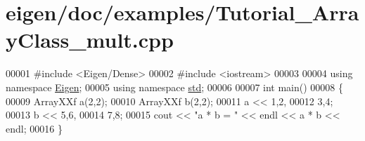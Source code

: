 \hypertarget{eigen_2doc_2examples_2_tutorial___array_class__mult_8cpp_source}{}\section{eigen/doc/examples/\+Tutorial\+\_\+\+Array\+Class\+\_\+mult.cpp}
\label{eigen_2doc_2examples_2_tutorial___array_class__mult_8cpp_source}

\begin{DoxyCode}
00001 \textcolor{preprocessor}{#include <Eigen/Dense>}
00002 \textcolor{preprocessor}{#include <iostream>}
00003 
00004 \textcolor{keyword}{using namespace }\hyperlink{namespace_eigen}{Eigen};
00005 \textcolor{keyword}{using namespace }\hyperlink{namespacestd}{std};
00006 
00007 \textcolor{keywordtype}{int} main()
00008 \{
00009   ArrayXXf a(2,2);
00010   ArrayXXf b(2,2);
00011   a << 1,2,
00012        3,4;
00013   b << 5,6,
00014        7,8;
00015   cout << \textcolor{stringliteral}{"a * b = "} << endl << a * b << endl;
00016 \}
\end{DoxyCode}
